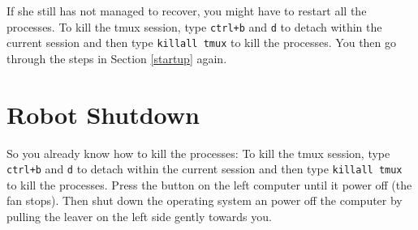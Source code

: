 \documentclass[a4paper,11pt]{article}
\begin{document}
If she still has not managed to recover, you might have to restart all the processes. To kill the tmux session, type \texttt{ctrl+b} and \texttt{d} to detach within the current session and then type \texttt{killall tmux} to kill the processes. You then go through the steps in Section \ref{startup} again.

\section{Robot Shutdown}
\label{shutdown}

So you already know how to kill the processes: To kill the tmux session, type \texttt{ctrl+b} and \texttt{d} to detach within the current session and then type \texttt{killall tmux} to kill the processes.
Press the button on the left computer until it power off (the fan stops).
Then shut down the operating system an power off the computer by pulling
the leaver on the left side gently towards you.
\end{document}
